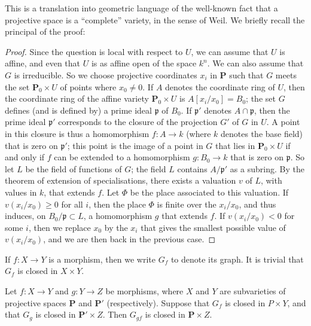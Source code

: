 \documentclass{article}
\theoremstyle{plain}
\newenvironment{lemma}[1]
    {\renewcommand\theinnerlemma{#1}\innerlemma}
    {\endinnerlemma}
\theoremstyle{definition}
\newcommand{\PP}{\mathbf{P}}
\renewcommand{\geq}{\geqslant}
\newcommand{\oldpage}[1]{\marginpar{\footnotesize$\Big\vert$ \textit{p.~#1}}}
\begin{document}
This is a translation into geometric language of the well-known fact that a projective space is a ``complete'' variety, in the sense of Weil.
We briefly recall the principal of the proof:

\begin{proof}
  Since the question is local with respect to $U$, we can assume that $U$ is affine, and even that $U$ is as affine open of the space $k^n$.
  We can also assume that $G$ is irreducible.
  So we choose projective coordinates $x_i$ in $\PP$ such that $G$ meets the set $\PP_0\times U$ of points where $x_0\neq0$.
  If $A$ denotes the coordinate ring of $U$, then the coordinate ring of the affine variety $\PP_0\times U$ is $A[x_i/x_0]=B_0$;
  the set $G$ defines (and is defined by) a prime ideal $\mathfrak{p}$ of $B_0$.
  If $\mathfrak{p}'$ denotes $A\cap\mathfrak{p}$, then the prime ideal $\mathfrak{p}'$ corresponds to the closure of the projection $G'$ of $G$ in $U$.
  A point in this closure is thus a homomorphism $f\colon A\to k$ (where $k$ denotes the base field) that is zero on $\mathfrak{p}'$;
\oldpage{100}
  this point is the image of a point in $G$ that lies in $\PP_0\times U$ if and only if $f$ can be extended to a homomorphism $g\colon B_0\to k$ that is zero on $\mathfrak{p}$.
  So let $L$ be the field of functions of $G$;
  the field $L$ contains $A/\mathfrak{p}'$ as a subring.
  By the theorem of extension of specialisations, there exists a valuation $v$ of $L$, with values in $k$, that extends $f$.
  Let $\Phi$ be the place associated to this valuation.
  If $v(x_i/x_0)\geq0$ for all $i$, then the place $\Phi$ is finite over the $x_i/x_0$, and thus induces, on $B_0/\mathfrak{p}\subset L$, a homomorphism $g$ that extends $f$.
  If $v(x_i/x_0)<0$ for some $i$, then we replace $x_0$ by the $x_i$ that gives the smallest possible value of $v(x_i/x_0)$, and we are then back in the previous case.
\end{proof}

If $f\colon X\to Y$ is a morphism, then we write $G_f$ to denote its graph.
It is trivial that $G_f$ is closed in $X\times Y$.

\begin{lemma}{4}
\label{lemma4}
  Let $f\colon X\to Y$ and $g\colon Y\to Z$ be morphisms, where $X$ and $Y$ are subvarieties of projective spaces $\PP$ and $\PP'$ (respectively).
  Suppose that $G_f$ is closed in $P\times Y$, and that $G_g$ is closed in $\PP'\times Z$.
  Then $G_{gf}$ is closed in $\PP\times Z$.
\end{lemma}
\end{document}

